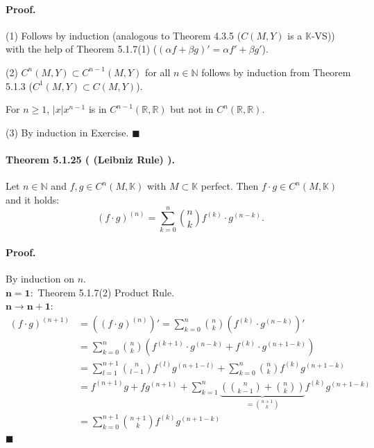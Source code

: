 \documentclass[12pt]{article}
\newcommand{\N}{\mathbb{N}}
\newcommand{\R}{\mathbb{R}}
\newcommand{\K}{\mathbb{K}} %
\newcommand{\NumberedTheorem}[3]{%
\paragraph*{Theorem #1 ( #2 ).} #3\par}
\begin{document}
\paragraph*{Proof.}

(1) Follows by induction (analogous to Theorem 4.3.5 ($C(M, Y)$ is a $\K$-VS)) with the help of Theorem 5.1.7(1) ($(\alpha f + \beta g)' = \alpha f' + \beta g'$).
\par
(2) $C^n(M, Y) \subset C^{n-1}(M, Y)$ for all $n \in \N$ follows by induction from Theorem 5.1.3 ($C^1(M, Y) \subset C(M, Y)$).
\par
For $n \ge 1$, $|x|x^{n-1}$ is in $C^{n-1}(\R, \R)$ but not in $C^n(\R, \R)$.
\par
(3) By induction in Exercise.
\hfill $\blacksquare$

\NumberedTheorem{5.1.25}{(Leibniz Rule)}{Let $n \in \N$ and $f, g \in C^n(M, \K)$ with $M \subset \K$ perfect. Then $f \cdot g \in C^n(M, \K)$ and it holds:
\[
(f \cdot g)^{(n)} = \sum_{k=0}^n \binom{n}{k} f^{(k)} \cdot g^{(n-k)}.
\]
}

\paragraph*{Proof.} By induction on $n$. \\
$\mathbf{n = 1}:$ Theorem 5.1.7(2) Product Rule. \\
$\mathbf{n \to n+1}:$
\begin{align*}
(f \cdot g)^{(n+1)} &= ((f \cdot g)^{(n)})' = \sum_{k=0}^n \binom{n}{k} (f^{(k)} \cdot g^{(n-k)})' \\
&= \sum_{k=0}^n \binom{n}{k} (f^{(k+1)} \cdot g^{(n-k)} + f^{(k)} \cdot g^{(n+1-k)}) \\
&= \sum_{l=1}^{n+1} \binom{n}{l-1} f^{(l)} g^{(n+1-l)} + \sum_{k=0}^n \binom{n}{k} f^{(k)} g^{(n+1-k)} \\
&= f^{(n+1)}g + fg^{(n+1)} + \sum_{k=1}^n \underbrace{\left( \binom{n}{k-1} + \binom{n}{k} \right)}_{= \binom{n+1}{k}} f^{(k)} g^{(n+1-k)} \\
&= \sum_{k=0}^{n+1} \binom{n+1}{k} f^{(k)} g^{(n+1-k)}
\end{align*}
\hfill $\blacksquare$
\end{document}
